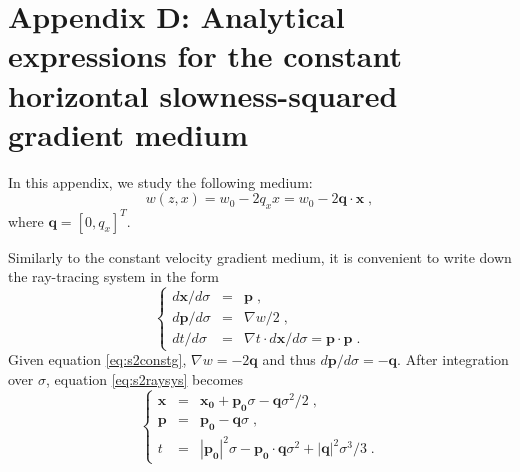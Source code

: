 \section{Appendix D: Analytical expressions for the constant horizontal slowness-squared gradient medium}
In this appendix, we study the following medium:
\begin{equation}
\label{eq:s2constg}
w (z,x) = w_0 - 2 q_x x = w_0 - 2 \mathbf{q} \cdot \mathbf{x}\;,
\end{equation}
where $\mathbf{q} = [0,q_x]^T$.

Similarly to the constant velocity gradient medium, it is convenient to write down the ray-tracing system in 
the form \cite[]{cerveny}
\begin{equation}
\label{eq:s2raysys}
\left\{ \begin{array}{lcl}
d \mathbf{x} / d \sigma & = & \mathbf{p}\;, \\
d \mathbf{p} / d \sigma & = & \nabla w / 2\;, \\
d t / d \sigma & = & \nabla t \cdot d \mathbf{x} / d \sigma = \mathbf{p} \cdot \mathbf{p}\;.
\end{array} \right.
\end{equation}
Given equation \ref{eq:s2constg}, $\nabla w = -2 \mathbf{q}$ and thus $d \mathbf{p} / d \sigma = - \mathbf{q}$. 
After integration over $\sigma$, equation \ref{eq:s2raysys} becomes
\begin{equation}
\label{eq:s2rayint}
\left\{ \begin{array}{lcl}
\mathbf{x} & = & \mathbf{x_0} + \mathbf{p_0} \sigma - \mathbf{q} \sigma^2/2\;, \\
\mathbf{p} & = & \mathbf{p_0} - \mathbf{q} \sigma\;, \\
t & = & | \mathbf{p_0} |^2 \sigma - \mathbf{p_0} \cdot \mathbf{q} \sigma^2 + | \mathbf{q} |^2 \sigma^3/3\;.
\end{array} \right.
\end{equation}


